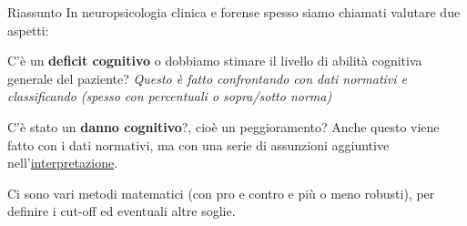 \documentclass[
  ignorenonframetext,
]{beamer}
\begin{document}
\begin{frame}{Riassunto}
\label{riassunto}
In neuropsicologia clinica e forense spesso siamo chiamati valutare due
aspetti:

C'è un \textbf{deficit cognitivo} o dobbiamo stimare il livello di
abilità cognitiva generale del paziente? \emph{Questo è fatto
confrontando con dati normativi e classificando (spesso con percentuali
o sopra/sotto norma)}

C'è stato un \textbf{danno cognitivo}?, cioè un peggioramento? Anche
questo viene fatto con i dati normativi, ma con una serie di assunzioni
aggiuntive nell'\underline{interpretazione}.

Ci sono vari metodi matematici (con pro e contro e più o meno robusti),
per definire i cut-off ed eventuali altre soglie.
\end{frame}
\end{document}
